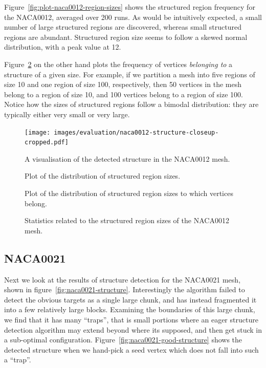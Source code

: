 Figure~\ref{fig:plot-naca0012-region-sizes} shows the structured region frequency for the NACA0012, averaged over 200 runs. As would be intuitively expected, a small number of large structured regions are discovered, whereas small structured regions are abundant. Structured region size seems to follow a skewed normal distribution, with a peak value at 12.

Figure~\ref{fig:plot-naca0012-node-region-sizes} on the other hand plots the frequency of vertices \emph{belonging to} a structure of a given size. For example, if we partition a mesh into five regions of size 10 and one region of size 100, respectively, then 50 vertices in the mesh belong to a region of size 10, and 100 vertices belong to a region of size 100. Notice how the sizes of structured regions follow a bimodal distribution: they are typically either very small or very large.

\begin{figure}
{
\texttt{[image: images/evaluation/naca0012-structure-closeup-cropped.pdf]}
}
\caption{A visualisation of the detected structure in the NACA0012 mesh.}
\label{fig:naca0012-structure}
\end{figure}


\begin{figure}
\sidebysidevertical
{

\caption{Plot of the distribution of structured region sizes.}
\label{fig:plot-naca0012-region-sizes}
}
{

\caption{Plot of the distribution of structured region sizes to which vertices belong.}
\label{fig:plot-naca0012-node-region-sizes}
}
\caption{Statistics related to the structured region sizes of the NACA0012 mesh.}
\end{figure}




\subsection{NACA0021}
Next we look at the results of structure detection for the NACA0021 mesh, shown in figure~\ref{fig:naca0021-structure}. Interestingly the algorithm failed to detect the obvious targets as a single large chunk, and has instead fragmented it into a few relatively large blocks. Examining the boundaries of this large chunk, we find that it has many ``traps'', that is small portions where an eager structure detection algorithm may extend beyond where its supposed, and then get stuck in a sub-optimal configuration. Figure~\ref{fig:naca0021-good-structure} shows the detected structure when we hand-pick a seed vertex which does not fall into such a ``trap''.





